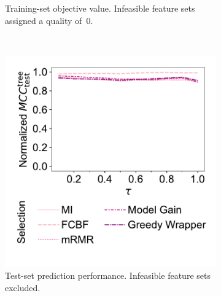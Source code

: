 \documentclass{article}
\theoremstyle{definition}
\begin{document}
\begin{figure}[p]
\begin{subfigure}[t]{0.48\textwidth}
		\caption{
			Training-set objective value.
			Infeasible feature sets assigned a quality of~0.
		}
		\label{fig:afs:impact-tau-fs-method-train-objective-max-fillna}
	\end{subfigure}
	\\ \vspace{\baselineskip}
	\begin{subfigure}[t]{0.48\textwidth}
		\centering
		\includegraphics[width=\textwidth, trim=20 40 15 15, clip]{plots/afs-impact-tau-fs-method-decision-tree-test-mcc-max.pdf}
		\caption{
			Test-set prediction performance.
			Infeasible feature sets excluded.
		}
		\label{fig:afs:impact-tau-fs-method-decision-tree-test-mcc-max}
	\end{subfigure}
	\hfill
	\begin{subfigure}[t]{0.48\textwidth}
		\centering

\end{subfigure}
\end{figure}
\end{document}
